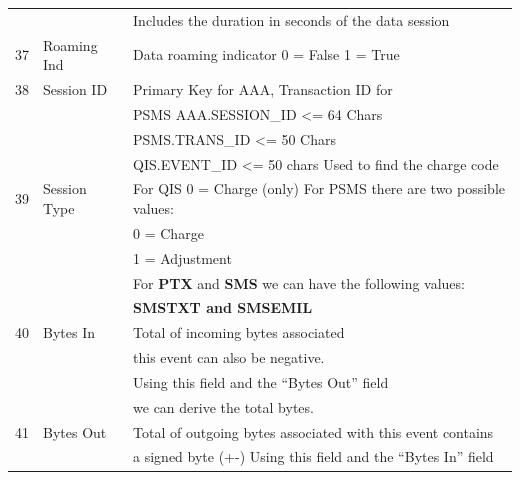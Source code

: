 \documentclass[12pt,twoside]{article}
\begin{document}
\begin{longtable}{cll}
                 &                           &  Includes the duration in seconds of the data session                   \\
             37  &  Roaming Ind              &  Data roaming indicator 0 = False 1 = True                              \\
             38  &  Session ID               &  Primary Key for AAA, Transaction ID for                                \\
                 &                           &  PSMS AAA.SESSION\_ID <= 64 Chars                                       \\
                 &                           &  PSMS.TRANS\_ID <= 50 Chars                                             \\
                 &                           &  QIS.EVENT\_ID <= 50 chars Used to find the charge code                 \\
             39  &  Session Type             &  For QIS 0 = Charge (only) For PSMS there are two possible values:      \\
                 &                           &  0 = Charge                                                             \\
                 &                           &  1 = Adjustment                                                         \\
                 &                           &  For \textbf{PTX} and \textbf{SMS} we can have the following values:    \\
                 &                           &  \textbf{SMSTXT and SMSEMIL}                                            \\
             40  &  Bytes In                 &  Total of incoming bytes associated                                     \\
                 &                           &  this event can also be negative.                                       \\
                 &                           &  Using this field and the ``Bytes Out'' field                           \\
                 &                           &  we can derive the total bytes.                                         \\
             41  &  Bytes Out                &  Total of outgoing bytes associated with this event contains            \\
                 &                           &  a signed byte (+-) Using this field and the ``Bytes In'' field         \\

\end{longtable}
\end{document}
